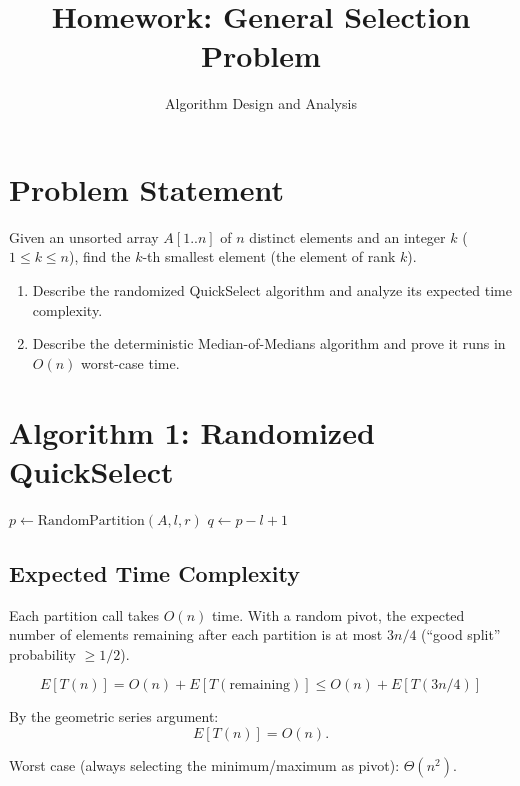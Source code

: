 \documentclass[12pt]{article}
\title{Homework: General Selection Problem}
\author{Algorithm Design and Analysis}
\date{}
\begin{document}
\maketitle

\section{Problem Statement}

Given an unsorted array $A[1..n]$ of $n$ distinct elements and an integer $k$
($1 \leq k \leq n$), find the $k$-th smallest element (the element of rank $k$).

\begin{enumerate}
  \item Describe the randomized QuickSelect algorithm and analyze its expected time complexity.
  \item Describe the deterministic Median-of-Medians algorithm and prove it runs in $O(n)$ worst-case time.
\end{enumerate}

\section{Algorithm 1: Randomized QuickSelect}

\begin{algorithm}[H]
\SetAlgoLined
{}
$p \leftarrow \text{RandomPartition}(A, l, r)$\;
$q \leftarrow p - l + 1$\;
\caption{Randomized QuickSelect}
\end{algorithm}

\subsection*{Expected Time Complexity}

Each partition call takes $O(n)$ time. With a random pivot, the expected number of elements
remaining after each partition is at most $3n/4$ (``good split'' probability $\geq 1/2$).

\[
  E[T(n)] = O(n) + E[T(\text{remaining})] \leq O(n) + E[T(3n/4)]
\]

By the geometric series argument:
\[
  E[T(n)] = O(n).
\]

Worst case (always selecting the minimum/maximum as pivot): $\Theta(n^2)$.
\end{document}
